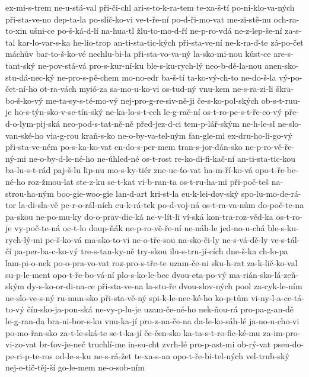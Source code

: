{ex-mi-s-trem
ne-u-stá-val
při-či-chl
ari-s-to-k-ra-tem
te-xa-š-tí
po-ni-klo-va-ných
při-sta-ve-no
dep-ta-la
po-slíč-ko-vi
ve-t-ře-ní
po-d-ři-mo-vat
me-zi-stě-nu
och-ra-to-xin
ušni-ce
po-š-ká-d-lí
na-hua-tl
žlu-to-mo-d-ří
ne-p-ro-vdá
ne-z-lep-še-ní
za-s-tal
kar-lo-var-s-ka
he-lio-trop
an-ti-sta-tic-kých
při-sta-ve-ní
ne-k-ra-ď-te
zá-po-čet
máchův
bar-to-š-ko-vé
nechlu-bi-la
při-sta-vo-va-ný
la-sko-mi-nou
kůst-ce
are-s-tant-ský
ne-pov-stá-vá
pro-s-kur-ní-ku
ble-s-ku-rych-lý
neo-b-dě-la-nou
anen-sko-stu-dá-nec-ký
ne-pro-s-pě-chem
mo-no-edr
ba-š-tí
ta-ko-vý-ch-to
ne-do-š-la
vý-po-čet-ní-ho
ot-ra-vách
myió-za
sa-mo-u-ko-vi
os-tud-ný
vnu-kem
ne-s-ra-zi-li
škra-bo-š-ko-vý
me-ta-sy-s-té-mo-vý
nej-pro-g-re-siv-ně-ji
če-s-ko-pol-ských
ob-s-t-ruu-je
ho-s-týn-sko-v-se-tín-ský
ne-ka-lo-s-t-ech
le-g-rač-ní
os-t-ro-pe-s-t-ře-co-vý
pře-d-o-lym-pij-ská
neo-pod-s-tat-ně-ně
před-jez-d-ci
tem-p-lář-ským
ne-h-le-sl
ne-slo-van-ské-ho
via-g-rou
kraň-s-ko
ne-o-by-va-tel-ným
fan-gle-mi
ex-dru-ho-li-go-vý
při-sta-ve-ném
po-s-ka-ko-vat
en-do-s-per-mem
tran-s-jor-dán-sko
ne-p-ro-vě-ře-ný-mi
ne-o-by-d-le-né-ho
ne-úhled-né
os-t-rost
re-ko-di-fi-kač-ní
an-ti-sta-tic-kou
ba-lu-s-t-rád
paj-š-lu
lip-nu
mo-s-ky-tiér
zne-uc-ťo-vat
ha-m-ří-ko-vá
opo-t-ře-be-né-ho
roz-žmou-lat
ste-z-ku
se-t-kat
vi-b-ran-ta
os-t-ru-ha-mi
při-poč-teš
na-strou-ha-ným
boo-gie-woo-gie
lan-d-art
kri-st-la
eu-k-lei-dov-ský
spo-lu-mo-de-rá-tor
la-di-sla-vě
pe-r-o-rál-ních
cu-k-rá-tek
po-d-voj-ná
os-t-ra-va-nům
do-poč-te-na
pa-skou
ne-po-mu-ky
do-o-prav-dic-ká
ne-v-lít-li
ví-ská
kon-tra-roz-věd-ka
os-t-ro-je
vy-poč-te-ná
oc-t-lo
doup-ňák
ne-p-ro-vě-ře-ní
ne-náh-le
jed-no-u-chá
ble-s-ku-rych-lý-mi
pe-š-ko-vá
ma-sko-to-vi
ne-o-tře-sou
na-sko-či-ly
ne-s-vá-dě-ly
ve-s-tál-čí
pa-per-ba-c-ko-vý
tre-s-tan-ky-ně
try-skou
ilu-s-tru-jí-cích
dne-š-ka
ch-lo-pa
lam-pi-o-nek
po-o-pra-vo-vat
roz-pro-s-tře-te
uzam-če-ni
sku-h-rat
za-k-lič-ko-val
su-p-le-ment
opo-t-ře-bo-vá-ní
plo-s-ko-le-bec
dvou-eta-po-vý
ma-rián-sko-lá-zeň-ským
dy-s-ko-or-di-na-ce
při-sta-ve-na
la-stu-ře
dvou-slov-ných
pool
za-cyk-le-ním
ne-slo-ve-s-ný
ru-mun-sko
při-sta-vě-ný
spi-k-le-nec-ké-ho
ko-p-tům
vi-ny-l-a-ce-tá-to-vý
čín-sko-ja-pon-ská
ne-vy-p-lu-je
uzam-če-né-ho
nek-ňou-rá
pro-pa-g-an-dě
le-g-ran-da
bra-ni-bor-s-ku
vnu-ka-jí
pro-z-na-če-na
da-le-ko-sáh-lé
ja-no-u-cho-vi
po-mo-řan-sko
za-t-le-ská-te
se-t-ka-jí
če-čen-sko
ka-ta-s-t-ro-fic-ké-mu
za-im-pro-vi-zo-vat
br-ťov-je-neč
truchlí-me
in-su-cht
zvrh-lé
pro-p-ast-mi
ob-rý-vat
pseu-do-pe-ri-p-te-ros
od-le-s-ku
ne-s-rá-žet
te-xa-s-an
opo-t-ře-bi-tel-ných
vel-trub-ský
nej-e-tič-těj-ší
go-le-mem
ne-o-sob-ním
}

